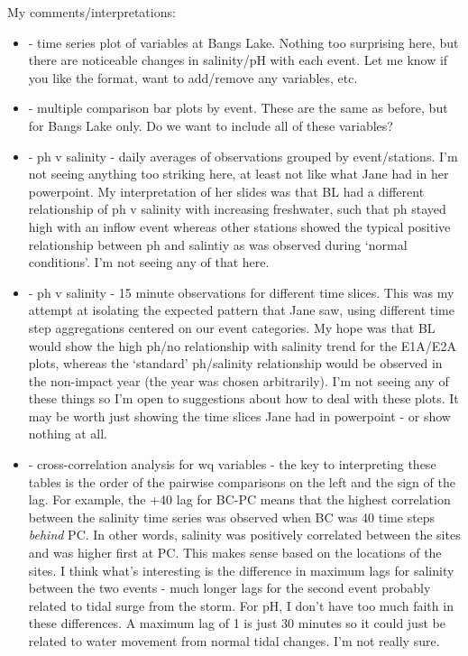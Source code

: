 \documentclass[letterpaper,12pt]{article}\usepackage[]{graphicx}\usepackage[]{color}
\begin{document}
My comments/interpretations:
\begin{itemize}
\item {} - time series plot of variables at Bangs Lake.  Nothing too surprising here, but there are noticeable changes in salinity/pH with each event.  Let me know if you like the format, want to add/remove any variables, etc.  
\item {} - multiple comparison bar plots by event.  These are the same as before, but for Bangs Lake only.  Do we want to include all of these variables?
\item {} - ph v salinity - daily averages of observations grouped by event/stations.  I'm not seeing anything too striking here, at least not like what Jane had in her powerpoint.  My interpretation of her slides was that BL had a different relationship of ph v salinity with increasing freshwater, such that ph stayed high with an inflow event whereas other stations showed the typical positive relationship between ph and salintiy as was observed during `normal conditions'.  I'm not seeing any of that here.
\item {} - ph v salinity - 15 minute observations for different time slices.  This was my attempt at isolating the expected pattern that Jane saw, using different time step aggregations centered on our event categories. My hope was that BL would show the high ph/no relationship with salinity trend for the E1A/E2A plots, whereas the `standard' ph/salinity relationship would be observed in the non-impact year (the year was chosen arbitrarily).  I'm not seeing any of these things so I'm open to suggestions about how to deal with these plots.  It may be worth just showing the time slices Jane had in powerpoint - or show nothing at all.
\item {} - cross-correlation analysis for wq variables - the key to interpreting these tables is the order of the pairwise comparisons on the left and the sign of the lag.  For example, the +40 lag for BC-PC means that the highest correlation between the salinity time series was observed when BC was 40 time steps \emph{behind} PC.  In other words, salinity was positively correlated between the sites and was higher first at PC.  This makes sense based on the locations of the sites.  I think what's interesting is the difference in maximum lags for salinity between the two events - much longer lags for the second event probably related to tidal surge from the storm.  For pH, I don't have too much faith in these differences.  A maximum lag of 1 is just 30 minutes so it could just be related to water movement from normal tidal changes.  I'm not really sure.

\end{itemize}
\end{document}
